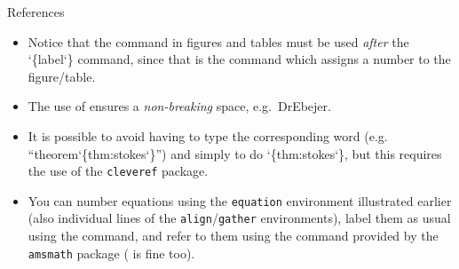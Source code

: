\documentclass{beamer}
\begin{document}
    \begin{frame}{References}
        \begin{itemize}
            \item Notice that the {} command in figures and tables must be used \emph{after} the {\char`\{label\char`\}} command, since that is the command which assigns a number to the figure/table.
            
            \medskip
            \item The use of {\ttfamily\raisebox{-3pt}{\char`~}} ensures a \emph{non-breaking} space, e.g.\ {\ttfamily Dr\raisebox{-3pt}{\char`~}Ebejer}. 
            
            \medskip
            \item It is possible to avoid having to type the corresponding word (e.g. ``{\ttfamily theorem\char`\{thm:stokes\char`\}}'') and simply to do {\char`\{thm:stokes\char`\}}, but this requires the use of the \texttt{cleveref} package. 
            
            \medskip
            \item You can number equations using the \texttt{equation} environment illustrated earlier (also individual lines of the \texttt{align}/\texttt{gather} environments), label them as usual using the {} command,  and refer to them using the {} command provided by the \texttt{amsmath} package ({} is fine too).
        \end{itemize}
    \end{frame}
\end{document}
